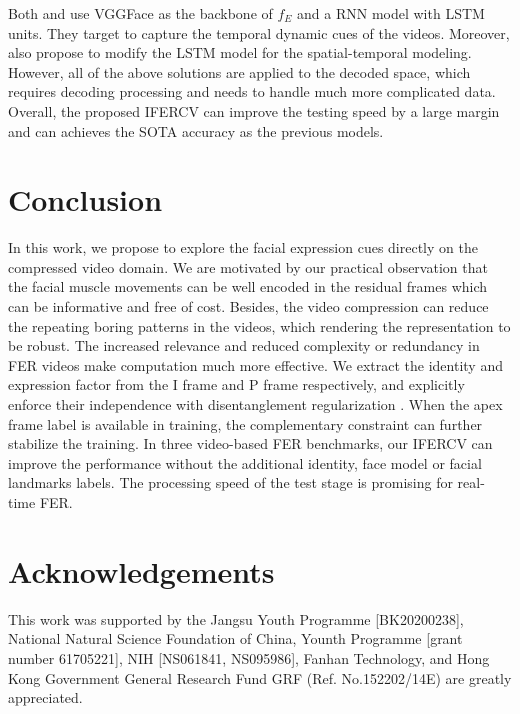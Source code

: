 \documentclass[a4paper,conference]{IEEEtran}
\begin{document}
Both \cite{fan2016video} and \cite{vielzeuf2017temporal} use VGGFace as the backbone of $f_E$ and a RNN model with LSTM units. They target to capture the temporal dynamic cues of the videos. Moreover, \cite{hu2019video,lee2019visual,pan2019deep} also propose to modify the LSTM model for the spatial-temporal modeling. However, all of the above solutions are applied to the decoded space, which requires decoding processing and needs to handle much more complicated data. Overall, the proposed IFERCV can improve the testing speed by a large margin and can achieves the SOTA accuracy as the previous models.



















\section{Conclusion}

In this work, we propose to explore the facial expression cues directly on the compressed video domain. We are motivated by our practical observation that the facial muscle movements can be well encoded in the residual frames which can be informative and free of cost. Besides, the video compression can reduce the repeating boring patterns in the videos, which rendering the representation to be robust. The increased relevance and reduced complexity or redundancy in FER videos make computation much more effective. We extract the identity and expression factor from the I frame and P frame respectively, and explicitly enforce their independence with disentanglement regularization \cite{liu2019feature}. When the apex frame label is available in training, the complementary constraint can further stabilize the training. In three video-based FER benchmarks, our IFERCV can improve the performance without the additional identity, face model or facial landmarks labels. The processing speed of the test stage is promising for real-time FER.  



\section{Acknowledgements}

This work was supported by the Jangsu Youth Programme [BK20200238], National Natural Science Foundation of China, Younth Programme [grant number 61705221], NIH [NS061841, NS095986], Fanhan Technology, and Hong Kong Government General Research Fund GRF (Ref. No.152202/14E) are greatly appreciated.







\end{document}
